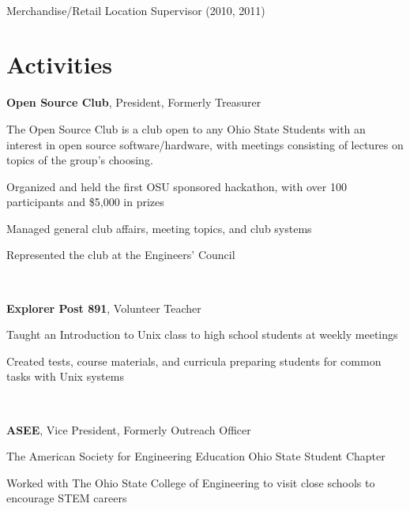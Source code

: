 \documentclass[letterpaper]{resume}
\begin{document}
~

Merchandise/Retail Location Supervisor (2010, 2011)

%

\section{Activities}

\textbf{Open Source Club}, President, Formerly Treasurer
\begin{compactitem}
\item The Open Source Club is a club open to any Ohio State Students with an
	interest in open source software/hardware, with meetings consisting of
	lectures on topics of the group's choosing.
\item Organized and held the first OSU sponsored hackathon, with over 100 participants and \$5,000 in prizes
\item Managed general club affairs, meeting topics, and club systems
\item Represented the club at the Engineers' Council
\end{compactitem}

~

\textbf{Explorer Post 891}, Volunteer Teacher
\begin{compactitem}
\item Taught an Introduction to Unix class to high school students at
	weekly meetings
\item Created tests, course materials, and curricula preparing students
	for common tasks with Unix systems
\end{compactitem}

~

\textbf{ASEE}, Vice President, Formerly Outreach Officer
\begin{compactitem}
\item The American Society for Engineering Education Ohio State Student Chapter
\item Worked with The Ohio State College of Engineering to visit close schools to encourage STEM careers
\end{compactitem}
\end{document}
